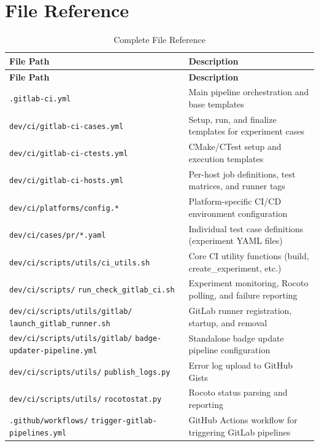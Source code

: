 \documentclass[11pt,letterpaper,twoside]{article}
\begin{document}
\section{File Reference}
\label{sec:file-ref}

\begin{longtable}{>{\raggedright\arraybackslash\small}p{6.8cm}p{7.7cm}}
\caption{Complete File Reference} \label{tab:file-ref} \\
\toprule
\textbf{File Path} & \textbf{Description} \\
\midrule
\endfirsthead
\toprule
\textbf{File Path} & \textbf{Description} \\
\midrule
\endhead
\bottomrule
\endfoot

\texttt{.gitlab-ci.yml} & Main pipeline orchestration and base templates \\
\texttt{dev/ci/gitlab-ci-cases.yml} & Setup, run, and finalize templates for experiment cases \\
\texttt{dev/ci/gitlab-ci-ctests.yml} & CMake/CTest setup and execution templates \\
\texttt{dev/ci/gitlab-ci-hosts.yml} & Per-host job definitions, test matrices, and runner tags \\
\texttt{dev/ci/platforms/config.*} & Platform-specific CI/CD environment configuration \\
\texttt{dev/ci/cases/pr/*.yaml} & Individual test case definitions (experiment YAML files) \\
\texttt{dev/ci/scripts/utils/ci\_utils.sh} & Core CI utility functions (build, create\_experiment, etc.) \\
\texttt{dev/ci/scripts/} \texttt{run\_check\_gitlab\_ci.sh} & Experiment monitoring, Rocoto polling, and failure reporting \\
\texttt{dev/ci/scripts/utils/gitlab/} \texttt{launch\_gitlab\_runner.sh} & GitLab runner registration, startup, and removal \\
\texttt{dev/ci/scripts/utils/gitlab/} \texttt{badge-updater-pipeline.yml} & Standalone badge update pipeline configuration \\
\texttt{dev/ci/scripts/utils/} \texttt{publish\_logs.py} & Error log upload to GitHub Gists \\
\texttt{dev/ci/scripts/utils/} \texttt{rocotostat.py} & Rocoto status parsing and reporting \\
\texttt{.github/workflows/} \texttt{trigger-gitlab-pipelines.yml} & GitHub Actions workflow for triggering GitLab pipelines \\

\end{longtable}
\end{document}
